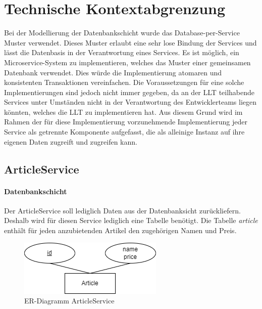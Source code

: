\section{Technische Kontextabgrenzung}
Bei der Modellierung der Datenbankschicht wurde das Database-per-Service Muster verwendet. Dieses Muster erlaubt eine sehr lose Bindung der Services und lässt die Datenbasis in der Verantwortung eines Services. Es ist möglich, ein Microservice-System zu implementieren, welches das Muster einer gemeinsamen Datenbank verwendet. Dies würde die Implementierung atomaren und konsistenten Transaktionen vereinfachen. Die Voraussetzungen für eine solche Implementierungen sind jedoch nicht immer gegeben, da an der LLT teilhabende Services unter Umständen nicht in der Verantwortung des Entwicklerteams liegen könnten, welches die LLT zu implementieren hat. Aus diesem Grund wird im Rahmen der für diese Implementierung vorzunehmende Implementierung jeder Service als getrennte Komponente aufgefasst, die als alleinige Instanz auf ihre eigenen Daten zugreift und zugreifen kann.


\subsection{ArticleService}
\paragraph*{Datenbankschicht}

Der ArticleService soll lediglich Daten aus der Datenbanksicht zurückliefern. Deshalb wird für diesen Service lediglich eine Tabelle benötigt. Die Tabelle \textit{article} enthält für jeden anzubietenden Artikel den zugehörigen Namen und Preis.

\begin{figure}[h!]
	\centering
	\includegraphics[scale=0.5]{figures/DatabaseER/ArticleServiceTables.png}
	\caption{ER-Diagramm ArticleService}
\end{figure}
\FloatBarrier

